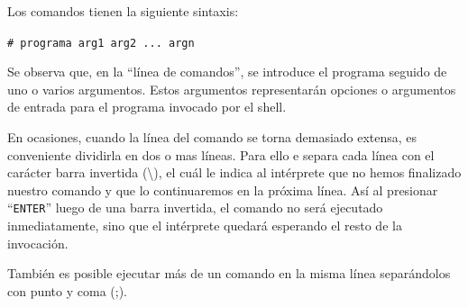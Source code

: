 \documentclass[12pt]{article}
\begin{document}
Los comandos tienen la siguiente sintaxis:

\texttt{\# programa arg1 arg2 ... argn}

Se observa que, en la ``línea de comandos'', se introduce el programa seguido de uno o varios argumentos. 
Estos argumentos representarán opciones o argumentos de entrada para el programa invocado por el shell. 



En ocasiones, cuando la línea del comando se torna demasiado extensa, es conveniente dividirla
en dos o mas líneas. Para ello e separa cada línea con el carácter barra invertida (\textbackslash), 
el cuál le indica al intérprete que no hemos finalizado nuestro comando y que lo continuaremos 
en la próxima línea. Así al presionar ``\texttt{ENTER}'' luego de una barra invertida, el comando 
no será ejecutado inmediatamente, sino que el intérprete quedará esperando el resto de la invocación. 

También es posible ejecutar más de un comando en la misma línea separándolos con punto y coma (;). 
\end{document}
